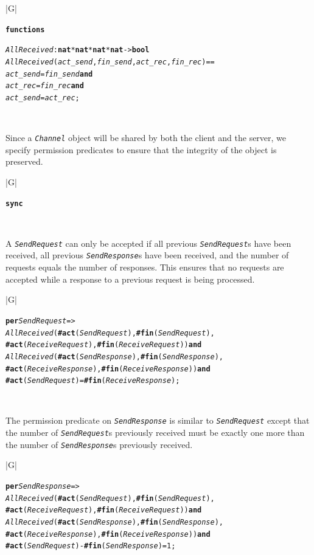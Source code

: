 \documentclass[\pformat,12pt,twoside]{article}
\newenvironment{VDMgray}%
{\begin{tabular}{|G|}\hline\small\begin{alltt}}%
{\end{alltt}\normalsize\\
 \hline\end{tabular}}
\begin{document}
\begin{VDMgray}
\textbf{functions}

 \textit{AllReceived} : \textbf{nat} * \textbf{nat} * \textbf{nat} * \textbf{nat} -\texttt{>} \textbf{bool}
 \textit{AllReceived}(\textit{act\_send}, \textit{fin\_send}, \textit{act\_rec}, \textit{fin\_rec}) ==
   \textit{act\_send} = \textit{fin\_send} \textbf{and}
   \textit{act\_rec} = \textit{fin\_rec} \textbf{and}
   \textit{act\_send} = \textit{act\_rec};
\end{VDMgray}


Since a \texttt{\emph{Channel}} object will be shared by both the client and 
the server, we specify permission predicates to ensure that the 
integrity of the object is preserved.

\begin{VDMgray}
\textbf{sync}
\end{VDMgray}


A \texttt{\emph{SendRequest}} can only be accepted if all previous
\texttt{\emph{SendRequest}}s have been received, all previous
\texttt{\emph{SendResponse}}s have been received, and the number of
requests equals the number of responses. This ensures that no requests
are accepted while a response to a previous request is being
processed.

\begin{VDMgray}
 \textbf{per} \textit{SendRequest} =\texttt{>}
   \textit{AllReceived}(\textbf{\#act}(\textit{SendRequest}), \textbf{\#fin}(\textit{SendRequest}),
        \textbf{\#act}(\textit{ReceiveRequest}), \textbf{\#fin}(\textit{ReceiveRequest})) \textbf{and}
   \textit{AllReceived}(\textbf{\#act}(\textit{SendResponse}), \textbf{\#fin}(\textit{SendResponse}),
        \textbf{\#act}(\textit{ReceiveResponse}), \textbf{\#fin}(\textit{ReceiveResponse})) \textbf{and}
   \textbf{\#act}(\textit{SendRequest}) = \textbf{\#fin}(\textit{ReceiveResponse});
\end{VDMgray}


The permission predicate on \texttt{\emph{SendResponse}} is similar to
\texttt{\emph{SendRequest}} except that the number of
\texttt{\emph{SendRequest}}s previously received must be exactly one
more than the number of \texttt{\emph{SendResponse}}s previously
received.

\begin{VDMgray}
 \textbf{per} \textit{SendResponse} =\texttt{>}
   \textit{AllReceived}(\textbf{\#act}(\textit{SendRequest}), \textbf{\#fin}(\textit{SendRequest}),
        \textbf{\#act}(\textit{ReceiveRequest}), \textbf{\#fin}(\textit{ReceiveRequest})) \textbf{and}
   \textit{AllReceived}(\textbf{\#act}(\textit{SendResponse}), \textbf{\#fin}(\textit{SendResponse}),
        \textbf{\#act}(\textit{ReceiveResponse}), \textbf{\#fin}(\textit{ReceiveResponse})) \textbf{and}
   \textbf{\#act}(\textit{SendRequest}) - \textbf{\#fin}(\textit{SendResponse}) = 1;
\end{VDMgray}
\end{document}
